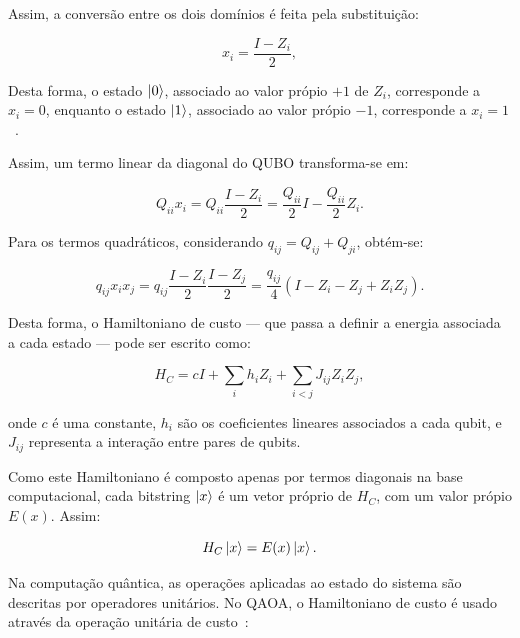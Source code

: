 Assim, a conversão entre os dois domínios é feita pela substituição:

\begin{equation}
    x_i = \frac{I - Z_i}{2},
\end{equation}

Desta forma, o estado \(\ket{0}\), associado ao valor própio \(+1\) de \(Z_i\),
corresponde a \(x_i = 0\), enquanto o estado \(\ket{1}\), associado ao valor própio
\(-1\), corresponde a \(x_i = 1\)~\cite{Lucas2014Ising}.

Assim, um termo linear da diagonal do \acs{QUBO} transforma-se em:

\begin{equation}
    Q_{ii}x_i
    =
    Q_{ii}\frac{I - Z_i}{2}
    =
    \frac{Q_{ii}}{2}I - \frac{Q_{ii}}{2}Z_i.
\end{equation}

Para os termos quadráticos, considerando $q_{ij}=Q_{ij}+Q_{ji}$, obtém-se:

\begin{equation}
    q_{ij}x_ix_j
    =
    q_{ij}\frac{I - Z_i}{2}\frac{I - Z_j}{2}
    =
    \frac{q_{ij}}{4}
    \left(I - Z_i - Z_j + Z_iZ_j\right).
\end{equation}

Desta forma, o Hamiltoniano de custo --- que passa a definir a energia associada a cada estado --- pode ser escrito como:

\begin{equation}
H_C =
cI
+
\sum_i h_i Z_i
+
\sum_{i<j} J_{ij} Z_iZ_j,
\end{equation}

onde $c$ é uma constante, $h_i$ são os coeficientes lineares associados a cada qubit, e $J_{ij}$ representa a interação entre pares de qubits.

Como este Hamiltoniano é composto apenas por termos diagonais na base computacional, cada bitstring $\ket{x}$ é um vetor próprio de $H_C$, com um valor própio $E(x)$. Assim:

\begin{equation}
H_C\ket{x}
=
E(x)\ket{x}.
\end{equation}

Na computação quântica, as operações aplicadas ao estado do sistema são descritas por operadores unitários. No \acs{QAOA}, o Hamiltoniano de custo é usado através da operação unitária de custo~\cite{Farhi2014QAOA}:


